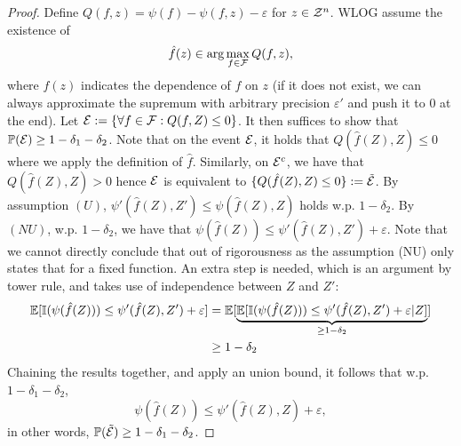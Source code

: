 \documentclass[twoside]{article}
\begin{document}
\begin{proof}
    Define $Q(f,z)=\psi(f)-\psi(f,z)-\varepsilon$ for $z\in \mathcal{Z}^n$. WLOG assume the existence of 
    \[\hat f(z)\in \arg\max_{f\in \mathcal{F}}Q(f,z),\]
    where $f(z)$ indicates the dependence of $f$ on $z$ (if it does not exist, we can always approximate the supremum with arbitrary precision $\varepsilon'$ and push it to $0$ at the end).
    Let $\mathcal{E}:=\{\forall f\in \mathcal{F}:Q(f,Z)\le 0\}$. It then suffices to show that $\mathbb{P}(\mathcal{E})\ge 1-\delta_1-\delta_2$.
    Note that on the event $\mathcal{E}$, it holds that $Q(\hat f(Z),Z)\le 0$ where we apply the definition of $\hat f$. Similarly, on $\mathcal{E}^c$, we have that $Q(\hat f(Z),Z)>0$ hence $\mathcal{E}$ is equivalent to $\{Q(\hat f(Z),Z)\le 0\}:=\tilde {\mathcal{E}}$. By assumption $(U)$, $\psi'(\hat f(Z),Z')\le \psi (\hat f(Z),Z)$ holds w.p. $1-\delta_2$. By $(NU)$, w.p. $1-\delta_2$, we have that $\psi(\hat f(Z))\le \psi'(\hat f(Z),Z')+\varepsilon$. Note that we cannot directly conclude that out of rigorousness as the assumption (NU) only states that for a fixed function. An extra step is needed, which is an argument by tower rule, and takes use of independence between $Z$ and $Z'$:
    \begin{align*}
        \mathbb{E}[\mathbb I(\psi(\hat f(Z)))\le \psi'(\hat f(Z),Z')+\varepsilon] &= \mathbb{E}[\underbrace{\mathbb{E}[\mathbb I(\psi(\hat f(Z)))\le \psi'(\hat f(Z),Z')+\varepsilon \vert Z]}_{\ge 1-\delta_2}]\\
        &\ge 1-\delta_2
    \end{align*}
    Chaining the results together, and apply an union bound, it follows that w.p. $1-\delta_1-\delta_2$, \[\psi(\hat f(Z))\le \psi'(\hat f(Z),Z)+\varepsilon,\]
    in other words, $\mathbb{P}(\tilde {\mathcal{E}})\ge 1-\delta_1-\delta_2$. 
    
\end{proof}
\end{document}
